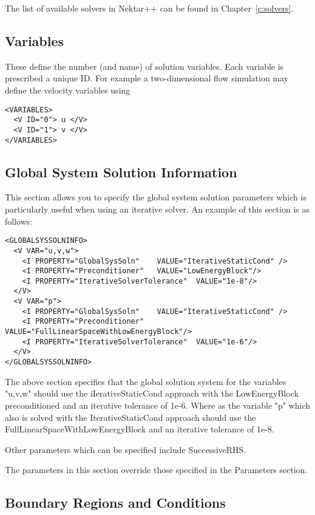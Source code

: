 The list of available solvers in Nektar++ can be found in
Chapter~\ref{c:solvers}.


\subsection{Variables}

These define the number (and name) of solution variables. Each variable is
prescribed a unique ID. For example a two-dimensional flow simulation may define
the velocity variables using

\begin{lstlisting}[style=XMLStyle]
<VARIABLES>
  <V ID="0"> u </V>
  <V ID="1"> v </V>
</VARIABLES>
\end{lstlisting}

\subsection{Global System Solution Information}

This section allows you to specify the global system solution parameters which
is particularly useful when using an iterative solver. An example of this
section is as follows:

\begin{lstlisting}[style=XMLStyle]
<GLOBALSYSSOLNINFO>
  <V VAR="u,v,w">
    <I PROPERTY="GlobalSysSoln"    VALUE="IterativeStaticCond" />
    <I PROPERTY="Preconditioner"   VALUE="LowEnergyBlock"/>
    <I PROPERTY="IterativeSolverTolerance"  VALUE="1e-8"/>
  </V>
  <V VAR="p">
    <I PROPERTY="GlobalSysSoln"    VALUE="IterativeStaticCond" />
    <I PROPERTY="Preconditioner"   VALUE="FullLinearSpaceWithLowEnergyBlock"/>
    <I PROPERTY="IterativeSolverTolerance"  VALUE="1e-6"/>
  </V>
</GLOBALSYSSOLNINFO>
\end{lstlisting}

The above section specifies that the global solution system for the variables
"u,v,w" should use the iIerativeStaticCond approach with the LowEnergyBlock
preconditioned and an iterative tolerance of 1e-6.  Where as the variable "p"
which also is solved with the IterativeStaticCond approach should use the
FullLinearSpaceWithLowEnergyBlock and an iterative tolerance of 1e-8.

Other parameters which can be specified include SuccessiveRHS. 

The parameters in this section override those specified in the Parameters section. 

\subsection{Boundary Regions and Conditions}

